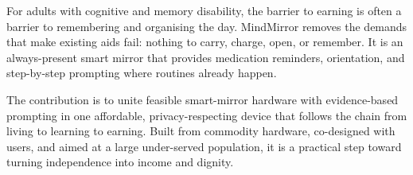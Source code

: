   \item {}

    For adults with cognitive and memory disability, the barrier to earning is often a
    barrier to remembering and organising the day. MindMirror removes the demands that
    make existing aids fail: nothing to carry, charge, open, or remember. It is an
    always-present smart mirror that provides medication reminders, orientation, and
    step-by-step prompting where routines already happen.

    The contribution is to unite feasible smart-mirror hardware with evidence-based
    prompting in one affordable, privacy-respecting device that follows the chain from
    living to learning to earning. Built from commodity hardware, co-designed with users,
    and aimed at a large under-served population, it is a practical step toward turning
    independence into income and dignity.

